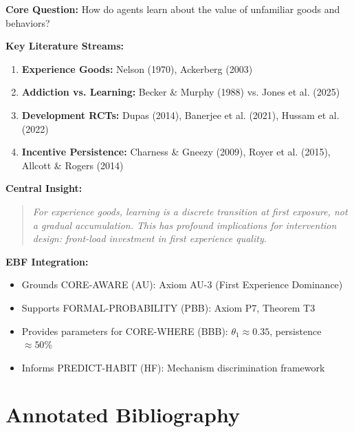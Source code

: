 \documentclass[11pt, a4paper]{article}
\begin{document}
\begin{tcolorbox}[colback=green!10!white, colframe=green!75!black,
    title=\textbf{Appendix XIX: Summary}]

\textbf{Core Question:} How do agents learn about the value of unfamiliar goods and behaviors?

\textbf{Key Literature Streams:}
\begin{enumerate}[nosep]
    \item \textbf{Experience Goods:} Nelson (1970), Ackerberg (2003)
    \item \textbf{Addiction vs. Learning:} Becker \& Murphy (1988) vs. Jones et al. (2025)
    \item \textbf{Development RCTs:} Dupas (2014), Banerjee et al. (2021), Hussam et al. (2022)
    \item \textbf{Incentive Persistence:} Charness \& Gneezy (2009), Royer et al. (2015), Allcott \& Rogers (2014)
\end{enumerate}

\textbf{Central Insight:}
\begin{quote}
\textit{For experience goods, learning is a discrete transition at first exposure, not a gradual accumulation. This has profound implications for intervention design: front-load investment in first experience quality.}
\end{quote}

\textbf{EBF Integration:}
\begin{itemize}[nosep]
    \item Grounds CORE-AWARE (AU): Axiom AU-3 (First Experience Dominance)
    \item Supports FORMAL-PROBABILITY (PBB): Axiom P7, Theorem T3
    \item Provides parameters for CORE-WHERE (BBB): $\theta_1 \approx 0.35$, persistence $\approx 50\%$
    \item Informs PREDICT-HABIT (HF): Mechanism discrimination framework
\end{itemize}

\end{tcolorbox}


\section{Annotated Bibliography}
\label{sec:lrn-bibliography}
\end{document}
